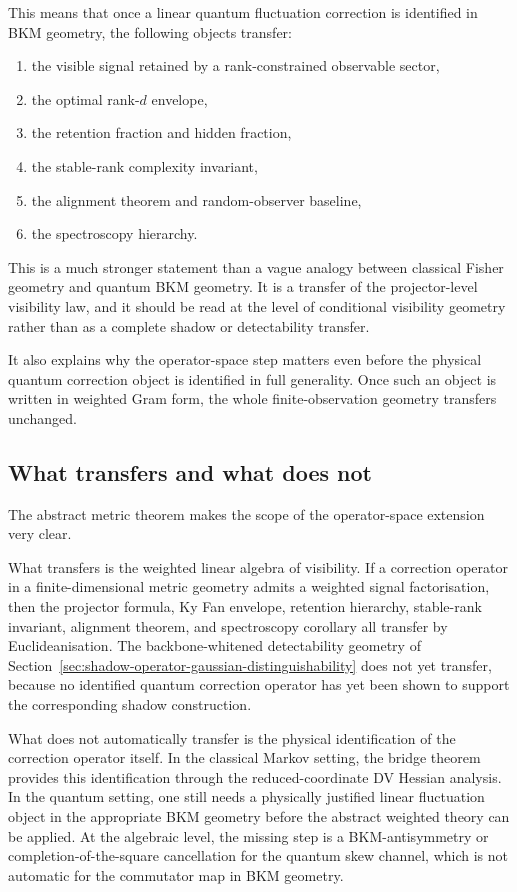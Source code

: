\documentclass[11pt,a4paper]{article}
\numberwithin{equation}{section}
\theoremstyle{thmcompact}
\theoremstyle{remark}
\begin{document}
This means that once a linear quantum fluctuation correction is identified in BKM geometry, the following objects transfer:

\begin{enumerate}
\item the visible signal retained by a rank-constrained observable sector,
\item the optimal rank-\(d\) envelope,
\item the retention fraction and hidden fraction,
\item the stable-rank complexity invariant,
\item the alignment theorem and random-observer baseline,
\item the spectroscopy hierarchy.
\end{enumerate}

This is a much stronger statement than a vague analogy between classical Fisher geometry and quantum BKM geometry. It is a transfer of the projector-level visibility law, and it should be read at the level of conditional visibility geometry rather than as a complete shadow or detectability transfer.

It also explains why the operator-space step matters even before the physical quantum correction object is identified in full generality. Once such an object is written in weighted Gram form, the whole finite-observation geometry transfers unchanged.

\subsection{What transfers and what does not}

The abstract metric theorem makes the scope of the operator-space extension very clear.

What transfers is the weighted linear algebra of visibility. If a correction operator in a finite-dimensional metric geometry admits a weighted signal factorisation, then the projector formula, Ky Fan envelope, retention hierarchy, stable-rank invariant, alignment theorem, and spectroscopy corollary all transfer by Euclideanisation. The backbone-whitened detectability geometry of Section~\ref{sec:shadow-operator-gaussian-distinguishability} does not yet transfer, because no identified quantum correction operator has yet been shown to support the corresponding shadow construction.

What does not automatically transfer is the physical identification of the correction operator itself. In the classical Markov setting, the bridge theorem provides this identification through the reduced-coordinate DV Hessian analysis. In the quantum setting, one still needs a physically justified linear fluctuation object in the appropriate BKM geometry before the abstract weighted theory can be applied. At the algebraic level, the missing step is a BKM-antisymmetry or completion-of-the-square cancellation for the quantum skew channel, which is not automatic for the commutator map in BKM geometry.
\end{document}
